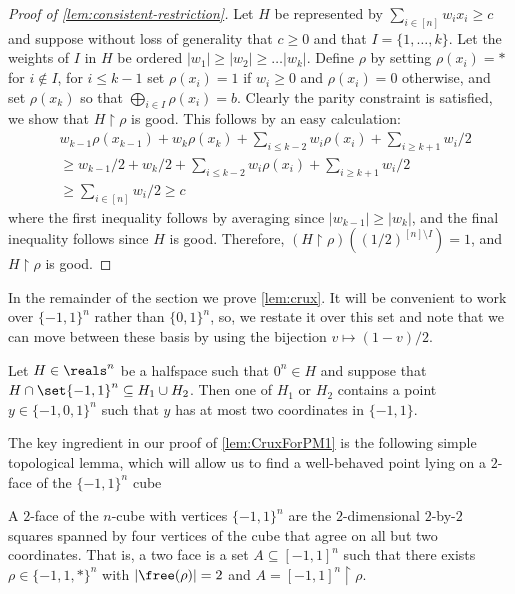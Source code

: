 \begin{proof}[Proof of \autoref{lem:consistent-restriction}]
	Let $H$ be represented by $\sum_{i \in [n]} w_i x_i \geq c$ and suppose without loss of generality that $c \geq 0$ and that $I = \{1, \ldots, k\}$. 
	Let the weights of $I$ in $H$ be ordered $|w_1| \geq |w_2| \geq \ldots |w_k|$. 
	Define $\rho$ by setting $\rho(x_i) = *$ for $i \not \in I$, for $i \leq k-1$ set $\rho(x_i) = 1$ if $w_i \geq 0$ and $\rho(x_i) = 0$ otherwise, and set $\rho(x_k)$ so that $\bigoplus_{i \in I} \rho(x_i) = b$. 
	Clearly the parity constraint is satisfied, we show that $H \restriction \rho$ is good.
	This follows by an easy calculation:
	\begin{align*} 
		 &w_{k-1}\rho(x_{k-1}) + w_k\rho(x_k) + \sum_{i \leq k-2} w_i \rho(x_i) + \sum_{i \geq k+1} w_i/2 \\
			&\geq w_{k-1}/2 + w_k/2 + \sum_{i \leq k-2} w_i \rho(x_i) + \sum_{i \geq k+1} w_i/2 	\\
			&\geq \sum_{i \in [n]} w_i/2 \geq c 
	\end{align*}
	where the first inequality follows by averaging since $|w_{k-1}| \geq |w_{k}|$, and the final inequality follows since $H$ is good. Therefore, $(H \restriction \rho)((1/2)^{[n]\setminus I}) =1 $, and $H \restriction \rho$ is good.
\end{proof}


In the remainder of the section we prove \autoref{lem:crux}.
It will be convenient to work over $\{-1,1\}^n$ rather than $\{0,1\}^n$, so, we restate it over this set and note that we can move between these basis by using the bijection $v \mapsto (1-v)/2$.

\begin{lemma}\label{lem:CruxForPM1}
	Let $H \in \reals^n$ be a halfspace such that $0^n \in H$ and suppose that $H \cap \set{-1,1}^n \subseteq H_1 \cup H_2$. 
	Then one of $H_1$ or $H_2$ contains a point $y \in \{-1,0,1\}^n$ such that $y$ has at most two coordinates in $\{-1,1\}$. 
\end{lemma}

The key ingredient in our proof of \autoref{lem:CruxForPM1} is the following simple topological lemma, which will allow us to find a well-behaved point lying on a $2$-face of the $\{-1,1\}^n$ cube

\begin{definition}[$2$-face]
	A $2$-face of the $n$-cube with vertices $\{-1,1\}^n$ are the $2$-dimensional $2$-by-$2$ squares spanned by four vertices of the cube that agree on all but two coordinates. 
%
That is, a two face is a set $A \subseteq [-1,1]^n$ such that there exists $\rho \in \{-1,1,*\}^n$ with $|\free(\rho)| = 2$ and $A = [-1,1]^n \restriction \rho$.
\end{definition}

